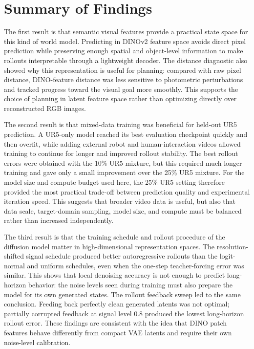 \documentclass[12pt]{report}
\begin{document}
\section{Summary of Findings}
The first result is that semantic visual features provide a practical state space for this kind of world model. Predicting in DINOv2 feature space avoids direct pixel prediction while preserving enough spatial and object-level information to make rollouts interpretable through a lightweight decoder. The distance diagnostic also showed why this representation is useful for planning: compared with raw pixel distance, DINO-feature distance was less sensitive to photometric perturbations and tracked progress toward the visual goal more smoothly. This supports the choice of planning in latent feature space rather than optimizing directly over reconstructed RGB images.

The second result is that mixed-data training was beneficial for held-out UR5 prediction. A UR5-only model reached its best evaluation checkpoint quickly and then overfit, while adding external robot and human-interaction videos allowed training to continue for longer and improved rollout stability. The best rollout errors were obtained with the 10\% UR5 mixture, but this required much longer training and gave only a small improvement over the 25\% UR5 mixture. For the model size and compute budget used here, the 25\% UR5 setting therefore provided the most practical trade-off between prediction quality and experimental iteration speed. This suggests that broader video data is useful, but also that data scale, target-domain sampling, model size, and compute must be balanced rather than increased independently.

The third result is that the training schedule and rollout procedure of the diffusion model matter in high-dimensional representation spaces. The resolution-shifted signal schedule produced better autoregressive rollouts than the logit-normal and uniform schedules, even when the one-step teacher-forcing error was similar. This shows that local denoising accuracy is not enough to predict long-horizon behavior: the noise levels seen during training must also prepare the model for its own generated states. The rollout feedback sweep led to the same conclusion. Feeding back perfectly clean generated latents was not optimal; partially corrupted feedback at signal level 0.8 produced the lowest long-horizon rollout error. These findings are consistent with the idea that DINO patch features behave differently from compact VAE latents and require their own noise-level calibration.
\end{document}

